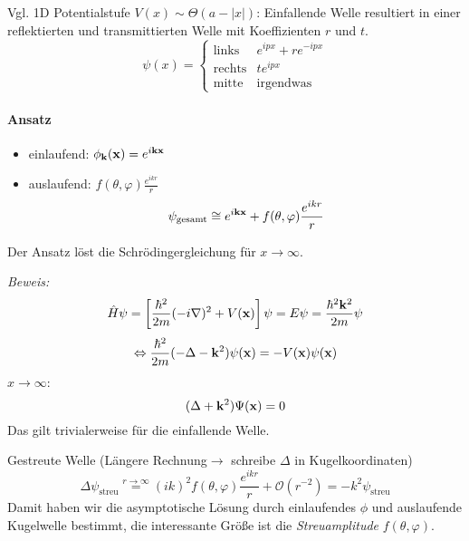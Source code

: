 \documentclass[11pt,a4paper]{report}
\begin{document}
Vgl. 1D Potentialstufe $V(x)\sim \Theta (a-|x|)$: Einfallende Welle resultiert in einer reflektierten und transmittierten Welle mit Koeffizienten $r$ und $t$.
$$\psi (x) = \left\{ \begin{matrix}
\text{links} & e^{ipx} + re^{-ipx} \\
\text{rechts} & te^{ipx} \\
\text{mitte} & \text{irgendwas}
\end{matrix}\right.$$

\paragraph{Ansatz} 
\begin{itemize}
\item einlaufend: $\phi_{\mathbf{k}}(\mathbf{x} )=e^{i\mathbf{k}\mathbf{x}}$
\item auslaufend: $ f(\theta ,\varphi ) \frac{e^{ikr}}{r}$
$$\psi_\text{gesamt} \cong e^{i\mathbf{k}\mathbf{x}} + f(\theta ,\varphi ) \frac{e^{ikr}}{r}$$
\end{itemize}
Der Ansatz löst die Schrödingergleichung für $x\rightarrow\infty$.\par 
\textit{Beweis:}
$$\hat{H}\psi = \left[\frac{\hbar^2}{2m} (-i\nabla )^2 + V(\mathbf{x})\right]\psi = E\psi=\frac{\hbar^2\mathbf{k}^2}{2m}\psi$$
$$\Leftrightarrow \frac{\hbar^2}{2m}(-\Delta -\mathbf{k}^2 )\psi (\mathbf{x}) = -V(\mathbf{x})\psi (\mathbf{x})$$
$x\rightarrow\infty$:
$$(\Delta + \mathbf{k}^2 )\Psi (\mathbf{x} )=0$$
Das gilt trivialerweise für die einfallende Welle.\par 
Gestreute Welle (Längere Rechnung$\rightarrow$ schreibe $\Delta$ in Kugelkoordinaten)
$$\Delta\psi_\text{streu} \overset{r\rightarrow\infty }{=} (ik)^2f(\theta ,\varphi ) \frac{e^{ikr}}{r}+\mathcal{O}(r^{-2}) = -k^2\psi_\text{streu} $$
Damit haben wir die asymptotische Lösung durch einlaufendes $\phi$ und auslaufende Kugelwelle bestimmt, die interessante Größe ist die \textit{Streuamplitude} $f(\theta ,\varphi )$.
\end{document}
